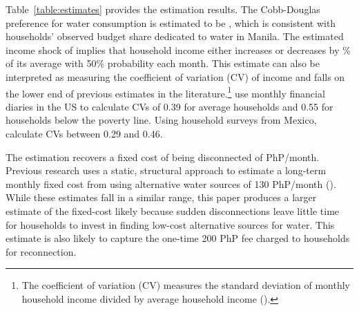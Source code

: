 \documentclass[12pt]{article}
\begin{document}


Table~\ref{table:estimates} provides the estimation results.  The Cobb-Douglas preference for water consumption is estimated to be \unskip, which is consistent with households' observed budget share dedicated to water in Manila.  The estimated income shock of implies that household income either increases or decreases by \unskip\% of its average with 50\% probability each month.  This estimate can also be interpreted as measuring the coefficient of variation (CV) of income and falls on the lower end of previous estimates in the literature.\footnote{The coefficient of variation (CV) measures the standard deviation of monthly household income divided by average household income (\cite{hannagan2015income}).}  \cite{hannagan2015income} use monthly financial diaries in the US to calculate CVs of 0.39 for average households and 0.55 for households below the poverty line.  Using household surveys from Mexico, \cite{amuedo2011remittances} calculate CVs between 0.29 and 0.46. %

The estimation recovers a fixed cost of being disconnected of PhP/month.  Previous research uses a static, structural approach to estimate a long-term monthly fixed cost from using alternative water sources of 130 PhP/month (\cite{wjv}).  While these estimates fall in a similar range, this paper produces a larger estimate of the fixed-cost likely because sudden disconnections leave little time for households to invest in finding low-cost alternative sources for water.  This estimate is also likely to capture the one-time 200 PhP fee charged to households for reconnection.
\end{document}
